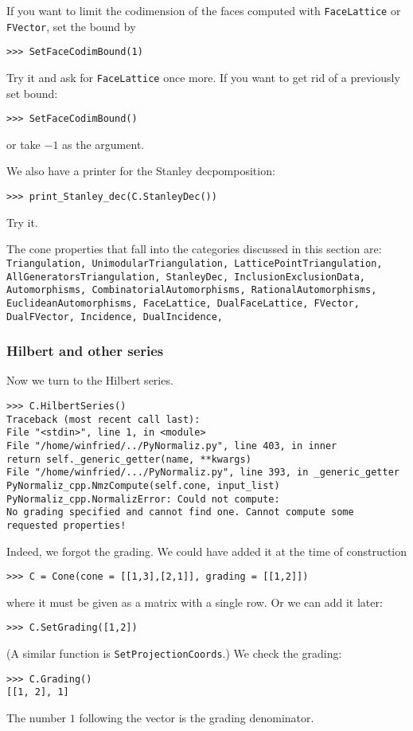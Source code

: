 \documentclass[12pt,a4paper]{scrartcl}
\theoremstyle{definition}
\def\ttt{\texttt}
\begin{document}
\begin{small}
If you want to limit the codimension of the faces computed with \verb|FaceLattice| or \verb|FVector|, set the bound by
\begin{Verbatim}
>>> SetFaceCodimBound(1)
\end{Verbatim}
Try it and ask for \verb|FaceLattice| once more. If you want to get rid of a previously set bound:
\begin{Verbatim}
>>> SetFaceCodimBound()
\end{Verbatim}
or take $-1$ as the argument.

We also have a printer for the Stanley decpomposition:
\begin{Verbatim}
>>> print_Stanley_dec(C.StanleyDec())
\end{Verbatim}
Try it.

The cone properties that fall into the categories discussed in this section are: \ttt{    Triangulation,
	UnimodularTriangulation,
	LatticePointTriangulation,
	AllGeneratorsTriangulation,
	StanleyDec,
	InclusionExclusionData,
	Automorphisms,
	CombinatorialAutomorphisms,
	RationalAutomorphisms,
	EuclideanAutomorphisms,
	FaceLattice,
	DualFaceLattice,
	FVector,
	DualFVector,
	Incidence,
	DualIncidence,}

\subsubsection{Hilbert and other series}

Now we turn to the Hilbert series.
\begin{Verbatim}
>>> C.HilbertSeries()
Traceback (most recent call last):
File "<stdin>", line 1, in <module>
File "/home/winfried/../PyNormaliz.py", line 403, in inner
return self._generic_getter(name, **kwargs)
File "/home/winfried/.../PyNormaliz.py", line 393, in _generic_getter
PyNormaliz_cpp.NmzCompute(self.cone, input_list)
PyNormaliz_cpp.NormalizError: Could not compute: 
No grading specified and cannot find one. Cannot compute some requested properties!
\end{Verbatim}
Indeed, we forgot the grading. We could have added it at the time of construction
\begin{Verbatim}
>>> C = Cone(cone = [[1,3],[2,1]], grading = [[1,2]])
\end{Verbatim}
where it must be given as a matrix with a single row. Or we can add it later:
\begin{Verbatim}
>>> C.SetGrading([1,2])
\end{Verbatim}
(A similar function is \verb|SetProjectionCoords|.) We check the grading:
\begin{Verbatim}
>>> C.Grading()
[[1, 2], 1]
\end{Verbatim}
The number $1$ following the vector is the grading denominator.


\end{small}
\end{document}

